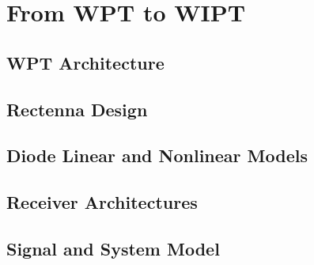 \chapter{From WPT to WIPT}



\section{WPT Architecture}\label{sec:wpt-architecture}
  

\section{Rectenna Design}\label{sec:rectenna-design}
  

\section{Diode Linear and Nonlinear Models}\label{diode-linear-and-nonlinear-models}
  

\section{Receiver Architectures}\label{receiver-architectures}
  

\section{Signal and System Model}\label{signal-and-system-model}
  
